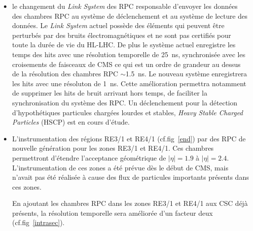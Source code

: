\begin{itemize}[label=$\bullet$]
	\item le changement du \textit{Link System} des RPC responsable d'envoyer les données des chambres RPC au système de déclenchement et au système de lecture des données. Le \textit{Link System} actuel possède des éléments qui peuvent être perturbés par des bruits électromagnétiques et ne sont pas certifiés pour toute la durée de vie du HL-LHC. De plus le système actuel enregistre les temps des hits avec une résolution temporelle de \SI{25}{\nano\second}, synchronisée avec les croisements de faisceaux de CMS ce qui est un ordre de grandeur au dessus de la résolution des chambres RPC $\sim$\SI{1.5}{\nano\second}. Le nouveau système enregistrera les hits avec une résoluton de \SI{1}{\nano\second}. Cette amélioration permettra notamment de supprimer les hits de bruit arrivant hors temps, de faciliter la synchronisation du système des RPC. Un déclenchement pour la détection d'hypothétiques particules chargées lourdes et stables, \textit{Heavy Stable Charged Particles} (HSCP) est en cours d'étude.
	
	\item L'instrumentation des régions RE3/1 et RE4/1 (cf.fig~\ref{end}) par des RPC de nouvelle génération pour les zones RE3/1 et RE4/1. Ces chambres permettront d'étendre l'acceptance géométrique de $|\eta|=\num{1.9}$ à  $|\eta|=\num{2.4}$. L'instrumentation de ces zones a été prévue dès le début de CMS, mais n'avait pas été réalisée à cause des flux de particules importants présents dans ces zones. 
	
	En ajoutant les chambres RPC dans les zones RE3/1 et RE4/1 aux CSC déjà présents, la résolution temporelle sera améliorée d'un facteur deux (cf.fig~\ref{intrasec}).
	

\end{itemize}
